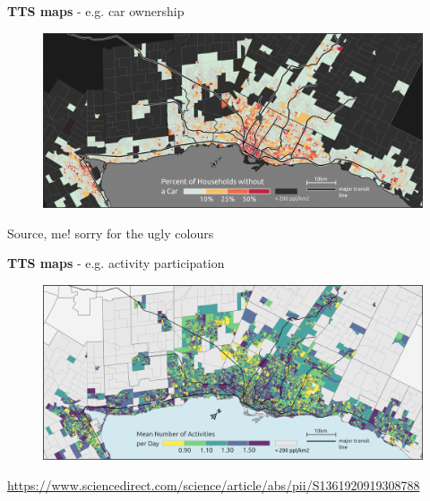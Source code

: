 \documentclass[aspectratio=169]{beamer}
\begin{document}
\begin{frame}
	
	\textbf{TTS maps} - e.g. car ownership
	
	\begin{figure}
		\centering
		\includegraphics[width=1\linewidth]{images/E_choro_nocar.png}
	\end{figure}

	\tiny Source, me! sorry for the ugly colours
	
\end{frame}



\begin{frame}
	
	\textbf{TTS maps} - e.g. activity participation
	
	\begin{figure}
		\centering
		\includegraphics[width=1\linewidth]{images/E_choro_acts.png}
	\end{figure}

	\tiny \url{https://www.sciencedirect.com/science/article/abs/pii/S1361920919308788}
	
\end{frame}
\end{document}
